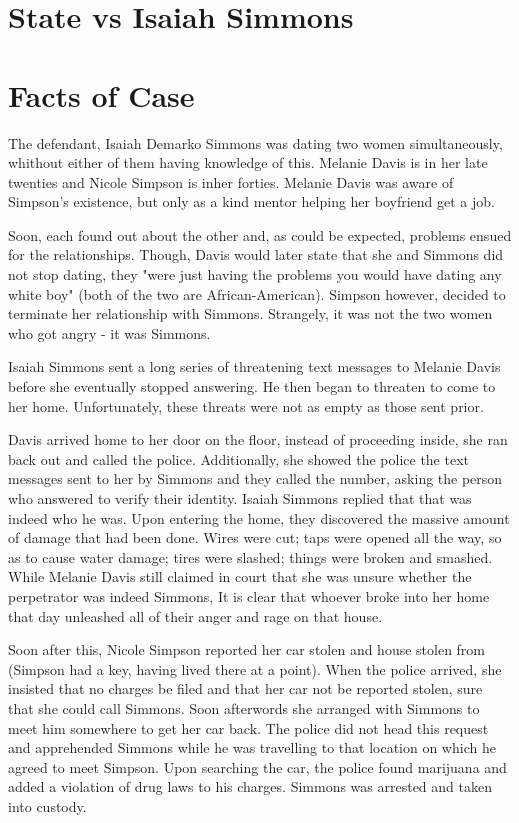 \documentclass[a4paper,titlepage,12pt]{turabian-researchpaper}
\begin{document}
\section{State vs Isaiah Simmons}

\section{Facts of Case}

The defendant, Isaiah Demarko Simmons was dating two women simultaneously,
whithout either of them having knowledge of this. Melanie Davis is in her late
twenties and Nicole Simpson is inher forties. Melanie Davis was aware of
Simpson's existence, but only as a kind mentor helping her boyfriend get a job.

Soon, each found out about the other and, as could be expected, problems ensued
for the relationships. Though, Davis would later state that she and Simmons did
not stop dating, they "were just having the problems you would have dating any
white boy" (both of the two are African-American). Simpson however, decided to
terminate her relationship with Simmons. Strangely, it was not the two women
who got angry - it was Simmons.

Isaiah Simmons sent a long series of threatening text messages to Melanie Davis
before she eventually stopped answering. He then began to threaten to come to
her home. Unfortunately, these threats were not as empty as those sent prior.

Davis arrived home to her door on the floor, instead of proceeding inside, she
ran back out and called the police. Additionally, she showed the police the
text messages sent to her by Simmons and they called the number, asking the
person who answered to verify their identity. Isaiah Simmons replied that that
was indeed who he was. Upon entering the home, they discovered the massive
amount of damage that had been done. Wires were cut; taps were opened all the
way, so as to cause water damage; tires were slashed; things
were broken and smashed. While Melanie Davis still claimed in court that she
was unsure whether the perpetrator was indeed Simmons, It is clear that whoever
broke into her home that day unleashed all of their anger and rage on that
house.

Soon after this, Nicole Simpson reported her car stolen and house stolen from
(Simpson had a key, having lived there at a point). When the police arrived,
she insisted that no charges be filed and that her car not be reported stolen,
sure that she could call Simmons. Soon afterwords she arranged with Simmons to
meet him somewhere to get her car back. The police did not head this request and
apprehended Simmons while he was travelling to that location on which he agreed
to meet Simpson. Upon searching the car, the police found marijuana and added
a violation of drug laws to his charges. Simmons was arrested and taken into
custody.
\end{document}
